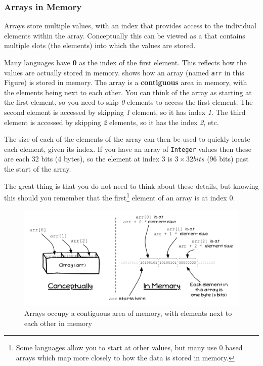 \subsubsection{Arrays in Memory} %
\label{ssub:arrays_in_memory}

Arrays store multiple values, with an index that provides access to the individual elements within the array. Conceptually this can be viewed as a  that contains multiple slots (the elements) into which the values are stored. 

Many languages have \textbf{0} as the index of the first element. This reflects how the values are actually stored in memory.  shows how an array (named \texttt{arr} in this Figure) is stored in memory. The array is a \textbf{contiguous} area in memory, with the elements being next to each other. You can think of the array as starting at the first element, so you need to skip \emph{0} elements to access the first element. The second element is accessed by skipping \emph{1} element, so it has index \emph{1}. The third element is accessed by skipping \emph{2} elements, so it has the index \emph{2}, etc.

The size of each of the elements of the array can then be used to quickly locate each element, given its index. If you have an array of \texttt{Integer} values then these are each 32 bits (4 bytes), so the element at index 3 is $3 \times 32bits$ (96 bits) past the start of the array.

The great thing is that you do not need to think about these details, but knowing this should you remember that the first\footnote{Some languages allow you to start at other values, but many use 0 based arrays which map more closely to how the data is stored in memory.} element of an array is at index 0.

\begin{figure}[h]
   \centering
   \includegraphics[width=\textwidth]{./topics/arrays/diagrams/ArrayIndex} 
   \caption{Arrays occupy a contiguous area of memory, with elements next to each other in memory }
   \label{fig:type-decl-array-idx}
\end{figure}

